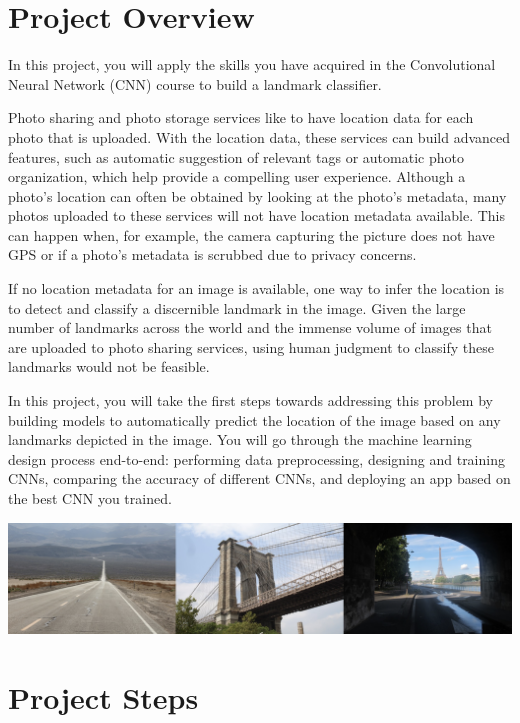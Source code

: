 
\section{Project Overview}

In this project, you will apply the skills you have acquired in the Convolutional Neural Network (CNN) course to build a landmark classifier.

Photo sharing and photo storage services like to have location data for each photo that is uploaded. With the location data, these services can build advanced features, such as automatic suggestion of relevant tags or automatic photo organization, which help provide a compelling user experience. Although a photo's location can often be obtained by looking at the photo's metadata, many photos uploaded to these services will not have location metadata available. This can happen when, for example, the camera capturing the picture does not have GPS or if a photo's metadata is scrubbed due to privacy concerns.

If no location metadata for an image is available, one way to infer the location is to detect and classify a discernible landmark in the image. Given the large number of landmarks across the world and the immense volume of images that are uploaded to photo sharing services, using human judgment to classify these landmarks would not be feasible.

In this project, you will take the first steps towards addressing this problem by building models to automatically predict the location of the image based on any landmarks depicted in the image. You will go through the machine learning design process end-to-end: performing data preprocessing, designing and training CNNs, comparing the accuracy of different CNNs, and deploying an app based on the best CNN you trained.

\includegraphics[width=1\linewidth]{cnn/landmarks-example.png}


\section{Project Steps}

